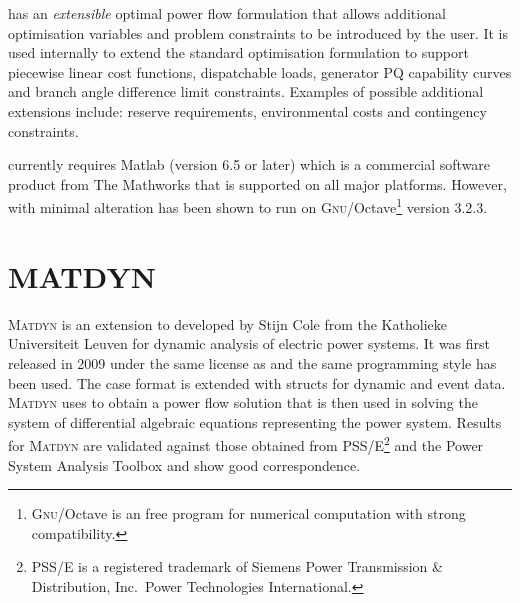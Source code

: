 \matpower has an \textit{extensible} optimal power flow formulation that allows
additional optimisation variables and problem constraints to be introduced by
the user.  It is used internally to extend the standard optimisation
formulation to support piecewise linear cost functions, dispatchable loads,
generator PQ capability curves and branch angle difference limit constraints.
Examples of possible additional extensions include: reserve requirements,
environmental costs and contingency constraints.

\matpower currently requires Matlab (version 6.5 or later) which is a
commercial software product from The Mathworks that is supported on all
major platforms.  However, with minimal alteration \matpower has been shown to
run on \textsc{Gnu}/Octave\footnote{\textsc{Gnu}/Octave is an free program for
numerical computation with strong \matlab compatibility.} version 3.2.3.

\section{MATDYN}
\textsc{Matdyn} is an extension to \matpower developed by Stijn Cole from the
Katholieke Universiteit Leuven for dynamic analysis of electric power systems.
It was first released in 2009 under the same license as \matpower and the
same programming style has been used.  The \matpower case format is extended
with structs for dynamic and event data.  \textsc{Matdyn} uses \matpower to obtain a power
flow solution that is then used in solving the system of differential
algebraic equations representing the power system.  Results for \textsc{Matdyn}
are validated against those obtained from PSS/E\footnote{PSS/E is a
registered trademark of Siemens Power Transmission \& Distribution, Inc.~Power
Technologies International.} and the Power System Analysis Toolbox and show
good correspondence.

